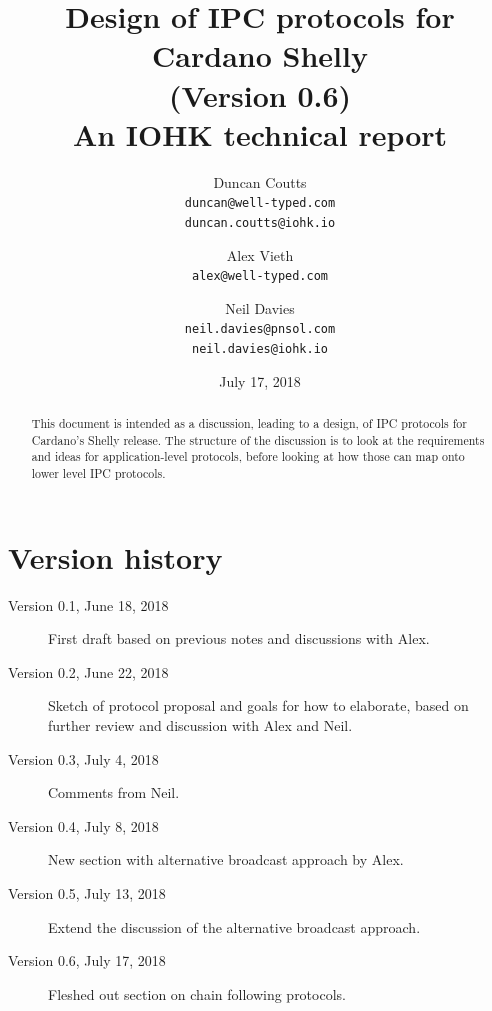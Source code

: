 \documentclass{article}
\theoremstyle{definition}{
  \newtheorem{lemma}{Lemma}[section] %
  \newtheorem{definition}[lemma]{Definition}
}
\theoremstyle{theorem}{
  \newtheorem{invariant}[lemma]{Invariant}
  \newtheorem{proofobligation}[lemma]{Proof Obligation}
}
\numberwithin{equation}{lemma}
\begin{document}
\title{Design of IPC protocols for Cardano Shelly \\
       {\small (Version 0.6)} \\
       {\large \sc An IOHK technical report}}
\author{Duncan Coutts \\ {\small \texttt{duncan@well-typed.com}} \\
                         {\small \texttt{duncan.coutts@iohk.io}}
   \and Alex Vieth \\ {\small \texttt{alex@well-typed.com}}
   \and Neil Davies \\ {\small \texttt{neil.davies@pnsol.com}} \\
                       {\small \texttt{neil.davies@iohk.io}}
   }
\date{July 17, 2018}

\maketitle

\begin{abstract}
This document is intended as a discussion, leading to a design, of IPC
protocols for Cardano's Shelly release. The structure of the discussion is to
look at the requirements and ideas for application-level protocols, before
looking at how those can map onto lower level IPC protocols.
\end{abstract}

\tableofcontents

\section*{Version history}

\begin{description}
\item[Version 0.1, June 18, 2018] First draft based on previous notes and
                                  discussions with Alex.
\item[Version 0.2, June 22, 2018] Sketch of protocol proposal and goals for
                                  how to elaborate, based on further review
                                  and discussion with Alex and Neil.
\item[Version 0.3, July 4, 2018]  Comments from Neil.
\item[Version 0.4, July 8, 2018]  New section with alternative broadcast approach by Alex.
\item[Version 0.5, July 13, 2018] Extend the discussion of the alternative broadcast approach.
\item[Version 0.6, July 17, 2018] Fleshed out section on chain following protocols.
\end{description}
\end{document}
